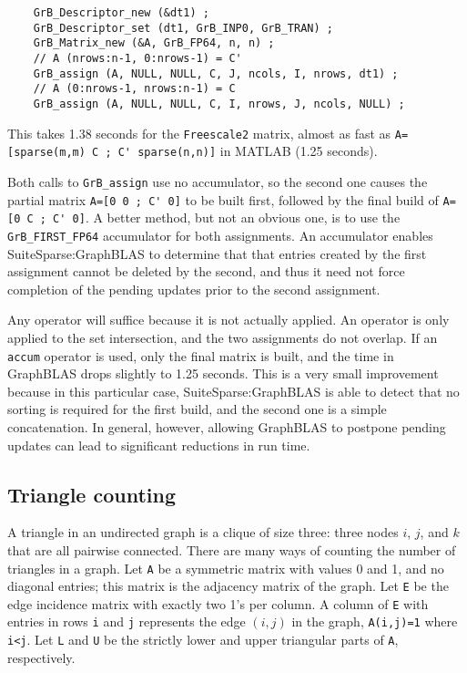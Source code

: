 \documentclass[12pt]{article}
\begin{document}
    {\footnotesize
    \begin{verbatim}
    GrB_Descriptor_new (&dt1) ;
    GrB_Descriptor_set (dt1, GrB_INP0, GrB_TRAN) ;
    GrB_Matrix_new (&A, GrB_FP64, n, n) ;
    // A (nrows:n-1, 0:nrows-1) = C'
    GrB_assign (A, NULL, NULL, C, J, ncols, I, nrows, dt1) ;
    // A (0:nrows-1, nrows:n-1) = C
    GrB_assign (A, NULL, NULL, C, I, nrows, J, ncols, NULL) ; \end{verbatim}}


This takes 1.38 seconds for the \verb'Freescale2' matrix, almost as fast as
\verb"A=[sparse(m,m) C ; C' sparse(n,n)]" in MATLAB (1.25 seconds).

Both calls to \verb'GrB_assign' use no accumulator, so the second one
causes the partial matrix \verb"A=[0 0 ; C' 0]" to be built first, followed by
the final build of \verb"A=[0 C ; C' 0]".  A better method, but not an obvious
one, is to use the \verb'GrB_FIRST_FP64' accumulator for both assignments.  An
accumulator enables SuiteSparse:GraphBLAS to determine that that entries
created by the first assignment cannot be deleted by the second, and thus it
need not force completion of the pending updates prior to the second
assignment.

Any operator will suffice because it is not actually applied.  An operator is
only applied to the set intersection, and the two assignments do not overlap.
If an \verb'accum' operator is used, only the final matrix is built, and the
time in GraphBLAS drops slightly to 1.25 seconds.  This is a very small
improvement because in this particular case, SuiteSparse:GraphBLAS is able to
detect that no sorting is required for the first build, and the second one is a
simple concatenation.  In general, however, allowing GraphBLAS to postpone
pending updates can lead to significant reductions in run time.

\newpage
\subsection{Triangle counting}
\label{triangle}

A triangle in an undirected graph is a clique of size three:  three nodes $i$,
$j$, and $k$ that are all pairwise connected.  There are many ways of counting
the number of triangles in a graph.  Let \verb'A' be a symmetric matrix with
values 0 and 1, and no diagonal entries; this matrix is the adjacency matrix of
the graph.  Let \verb'E' be the edge incidence matrix with exactly two 1's per
column.  A column of \verb'E' with entries in rows \verb'i' and \verb'j'
represents the edge $(i,j)$ in the graph, \verb'A(i,j)=1' where \verb'i<j'.
Let \verb'L' and \verb'U' be the strictly lower and upper triangular parts of
\verb'A', respectively.
\end{document}
